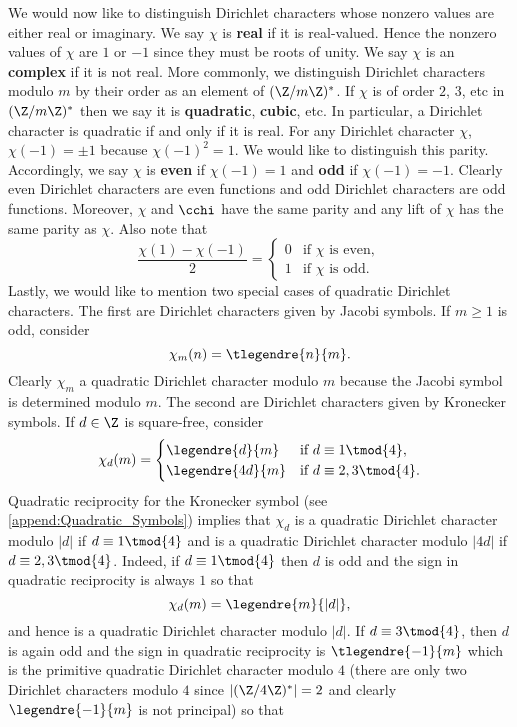       We would now like to distinguish Dirichlet characters whose nonzero values are either real or imaginary. We say $\chi$ is \textbf{real} if it is real-valued. Hence the nonzero values of $\chi$ are $1$ or $-1$ since they must be roots of unity. We say $\chi$ is an \textbf{complex} if it is not real. More commonly, we distinguish Dirichlet characters modulo $m$ by their order as an element of $(\Z/m\Z)^{\ast}$. If $\chi$ is of order $2$, $3$, etc in $(\Z/m\Z)^{\ast}$ then we say it is \textbf{quadratic}, \textbf{cubic}, etc. In particular, a Dirichlet character is quadratic if and only if it is real. For any Dirichlet character $\chi$, $\chi(-1) = \pm 1$ because $\chi(-1)^{2} = 1$. We would like to distinguish this parity. Accordingly, we say $\chi$ is \textbf{even} if $\chi(-1) = 1$ and \textbf{odd} if $\chi(-1) = -1$. Clearly even Dirichlet characters are even functions and odd Dirichlet characters are odd functions. Moreover, $\chi$ and $\cchi$ have the same parity and any lift of $\chi$ has the same parity as $\chi$. Also note that
      \[
        \frac{\chi(1)-\chi(-1)}{2} = \begin{cases} 0 & \text{if $\chi$ is even}, \\ 1 & \text{if $\chi$ is odd}. \end{cases}
      \]
      Lastly, we would like to mention two special cases of quadratic Dirichlet characters. The first are Dirichlet characters given by Jacobi symbols. If $m \ge 1$ is odd, consider
      \[
        \chi_{m}(n) = \tlegendre{n}{m}.
      \]
      Clearly $\chi_{m}$ a quadratic Dirichlet character modulo $m$ because the Jacobi symbol is determined modulo $m$. The second are Dirichlet characters given by Kronecker symbols. If $d \in \Z$ is square-free, consider
      \[
        \chi_{d}(m) = \begin{cases} \legendre{d}{m} & \text{if $d \equiv 1 \tmod{4}$}, \\ \legendre{4d}{m} & \text{if $d \equiv 2,3 \tmod{4}$}. \end{cases}
      \]
      Quadratic reciprocity for the Kronecker symbol (see \cref{append:Quadratic_Symbols}) implies that $\chi_{d}$ is a quadratic Dirichlet character modulo $|d|$ if $d \equiv 1 \tmod{4}$ and is a quadratic Dirichlet character modulo $|4d|$ if $d \equiv 2,3 \tmod{4}$. Indeed, if $d \equiv 1 \tmod{4}$ then $d$ is odd and the sign in quadratic reciprocity is always $1$ so that
      \[
        \chi_{d}(m) = \legendre{m}{|d|},
      \]
      and hence is a quadratic Dirichlet character modulo $|d|$. If $d \equiv 3 \tmod{4}$, then $d$ is again odd and the sign in quadratic reciprocity is $\tlegendre{-1}{m}$ which is the primitive quadratic Dirichlet character modulo $4$ (there are only two Dirichlet characters modulo $4$ since $|(\Z/4\Z)^{\ast}| = 2$ and clearly $\legendre{-1}{m}$ is not principal) so that

